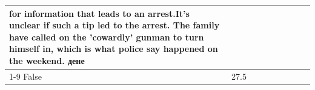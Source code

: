 \begin{table}[H]
\begin{tabular}{lllrlllll}
for information that leads to an arrest.It's unclear if such a tip led to the arrest. The family have called on the 'cowardly' gunman to turn himself in, which is what police say happened on the weekend. дене \\
\cline{1-9}
False & 27.5%
\end{tabular}
\end{table}
